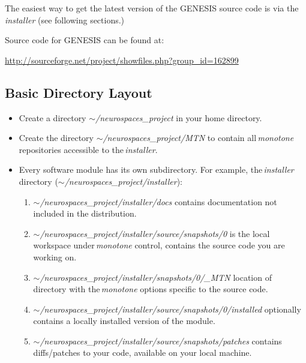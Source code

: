 \documentclass[12pt]{article}
\begin{document}
The easiest way to get the latest version of the GENESIS source code is via the {\it installer} (see following sections.)

Source code for GENESIS can be found at:

\href{http://sourceforge.net/project/showfiles.php?group_id=162899}{http://sourceforge.net/project/showfiles.php?group\_id=162899}

\subsection*{Basic Directory Layout}

\begin{itemize}

\item Create a directory {\it $\sim$/neurospaces\_project} in your home directory.
\item Create the directory {\it $\sim$/neurospaces\_project/MTN} to contain all\,{\it monotone} repositories accessible to the\,{\it installer}.
\item Every software module has its own subdirectory. For example, the\,{\it installer} directory ({\it $\sim$/neurospaces\_project/installer}):

\begin{enumerate}

\item[] {\it $\sim$/neurospaces\_project/installer/docs} contains documentation not included in the distribution. 

\item[] {\it $\sim$/neurospaces\_project/installer/source/snapshots/0} is the local workspace under\,{\it monotone} control, contains the source code you are working on. 

\item[] {\it $\sim$/neurospaces\_project/installer/snapshots/0/\_MTN} location of directory with the\,{\it monotone} options specific to the source code.

\item[] {\it $\sim$/neurospaces\_project/installer/source/snapshots/0/installed} optionally contains a locally installed version of the module.

\item[] {\it $\sim$/neurospaces\_project/installer/source/snapshots/patches} contains diffs/patches to your code, available on your local machine.

\end{enumerate}


\end{itemize}
\end{document}
